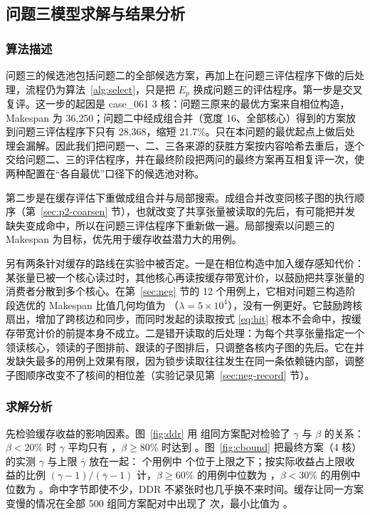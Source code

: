 \subsection{问题三模型求解与结果分析}

\subsubsection{算法描述}\label{sec:p3-solve}

问题三的候选池包括问题二的全部候选方案，再加上在问题三评估程序下做的后处理，流程仍为算法~\ref{alg:select}，只是把 $E_p$ 换成问题三的评估程序。第一步是交叉复评。这一步的起因是 case\_061 3 核：问题三原来的最优方案来自相位构造，Makespan 为 36{,}250；问题二中经成组合并（宽度 16、全部核心）得到的方案放到问题三评估程序下只有 28{,}368，缩短 21.7\%。只在本问题的最优起点上做后处理会漏解。因此我们把问题一、二、三各来源的获胜方案按内容哈希去重后，逐个交给问题二、三的评估程序，并在最终阶段把两问的最终方案再互相复评一次，使两种配置在“各自最优”口径下的候选池对称。

第二步是在缓存评估下重做成组合并与局部搜索。成组合并改变同核子图的执行顺序（第~\ref{sec:p2-coarsen} 节），也就改变了共享张量被读取的先后，有可能把并发缺失变成命中，所以在问题三评估程序下重新做一遍。局部搜索以问题三的 Makespan 为目标，优先用于缓存收益潜力大的用例。

另有两条针对缓存的路线在实验中被否定。一是在相位构造中加入缓存感知代价：某张量已被一个核心读过时，其他核心再读按缓存带宽计价，以鼓励把共享张量的消费者分散到多个核心。在第~\ref{sec:neg} 节的 12 个用例上，它相对问题三构造阶段选优的 Makespan 比值几何均值为 （$\lambda=5\times10^4$），没有一例更好。它鼓励跨核扇出，增加了跨核边和同步，而同时发起的读取按式 \eqref{eq:hit} 根本不会命中，按缓存带宽计价的前提本身不成立。二是错开读取的后处理：为每个共享张量指定一个领读核心，领读的子图排前、跟读的子图排后，只调整各核内子图的先后。它在并发缺失最多的用例上效果有限，因为锁步读取往往发生在同一条依赖链内部，调整子图顺序改变不了核间的相位差（实验记录见第~\ref{sec:neg-record} 节）。

\subsubsection{求解分析}

先检验缓存收益的影响因素。图~\ref{fig:ddr} 用  组同方案配对检验了 $\gamma$ 与 $\beta$ 的关系：$\beta<20\%$ 时 $\gamma$ 平均只有 ，$\beta\ge 80\%$ 时达到 。图~\ref{fig:cbound} 把最终方案（4 核）的实测 $\gamma$ 与上限 $\bar\gamma$ 放在一起： 个用例中  个位于上限之下；按实际收益占上限收益的比例 $(\gamma-1)/(\bar\gamma-1)$ 计，$\beta\ge 60\%$ 的用例中位数为 ，$\beta<30\%$ 的用例中位数为 。命中字节即使不少，DDR 不紧张时也几乎换不来时间。缓存让同一方案变慢的情况在全部 500 组同方案配对中出现了  次，最小比值为 。


